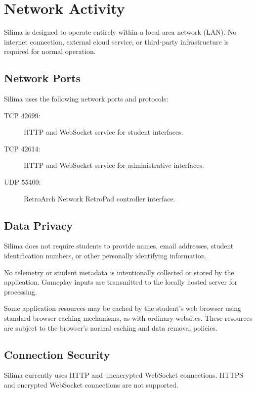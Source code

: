 \section{Network Activity}

Silima is designed to operate entirely within a local area
network (LAN). No internet connection, external cloud service,
or third-party infrastructure is required for normal operation.

\subsection{Network Ports}

Silima uses the following network ports and protocols:

\begin{description}
    \item[TCP 42699:]
    HTTP and WebSocket service for student interfaces.

    \item[TCP 42614:]
    HTTP and WebSocket service for administrative interfaces.

    \item[UDP 55400:]
    RetroArch Network RetroPad controller interface.
\end{description}

\subsection{Data Privacy}

Silima does not require students to provide names, email
addresses, student identification numbers, or other
personally identifying information.

No telemetry or student metadata is intentionally collected
or stored by the application. Gameplay inputs are transmitted
to the locally hosted server for processing.

Some application resources may be cached by the student's
web browser using standard browser caching mechanisms,
as with ordinary websites. These resources are subject
to the browser's normal caching and data removal policies.

\subsection{Connection Security}

Silima currently uses HTTP and unencrypted WebSocket
connections. HTTPS and encrypted WebSocket connections
are not supported.

